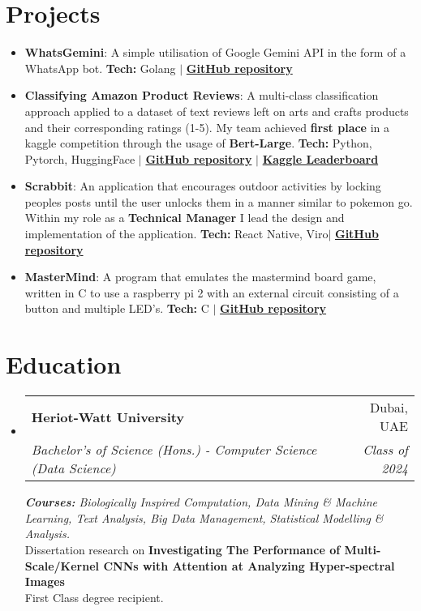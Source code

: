 \documentclass[a4paper,30pt]{article}
\makeatletter
\newcommand{\resumeItem}[2] {
	\item\small{
		\textbf{#1}{: #2 \vspace{-2pt}}
	}
}
\newcommand{\resumeSubheading}[4] {
	\vspace{-1pt}\item
	\begin{tabular*}{0.97\textwidth}{l@{\extracolsep{\fill}}r}
		\textbf{#1} & #2 \\
		\textit{#3} & \textit{#4} \\
	\end{tabular*}\vspace{-5pt}
}
\newcommand{\resumeSubItem}[2]{\resumeItem{#1}{#2}\vspace{-3pt}}
\newcommand{\resumeSubHeadingListStart}{\begin{itemize}[leftmargin=*]}
\newcommand{\resumeSubHeadingListEnd}{\end{itemize}}
\makeatother
\begin{document}
\section{Projects}
	\resumeSubHeadingListStart
        \resumeSubItem{WhatsGemini}{A simple utilisation of Google Gemini API in the form of a WhatsApp bot. \textbf{Tech:} Golang $\vert$ \href{https://github.com/asa30/WhatsGemini}{\textbf{GitHub repository}}}
        \resumeSubItem{Classifying Amazon Product Reviews}{A multi-class classification approach applied to a dataset of text reviews left on arts and crafts products and their corresponding ratings (1-5). My team achieved \textbf{first place} in a kaggle competition through the usage of \textbf{Bert-Large}.
        \textbf{Tech:} Python, Pytorch, HuggingFace
        $\vert$
        \href{https://github.com/fgs2/kaggle-comp-2024}{\textbf{GitHub repository}}
        $\vert$
        \href{https://www.kaggle.com/competitions/f20f21-aa-2023-2024-cw2/leaderboard}{\textbf{Kaggle Leaderboard}}
        }
		\resumeSubItem{Scrabbit}{ An application that encourages outdoor activities by locking peoples posts until the user unlocks them in a manner similar to pokemon go. Within my role as a \textbf{Technical Manager} I lead the design and implementation of the application.  \textbf{Tech:} React Native, Viro$\vert$ \href{https://github.com/Aucta-Studio/Scrabbit-expo}{\textbf{GitHub repository}}}
		\vspace{2pt}
		\resumeSubItem{MasterMind}{ A program that emulates the mastermind board game, written in C to use a raspberry pi 2 with an external circuit consisting of a button and multiple LED's. \textbf{Tech:} C $\vert$ \href{https://github.com/asa30/MasterMind}{\textbf{GitHub repository}}}
		\vspace{2pt}
	\resumeSubHeadingListEnd
	\vspace{-5pt}

\section{Education}
	\resumeSubHeadingListStart
		\resumeSubheading{Heriot-Watt University}{Dubai, UAE}{Bachelor's of Science (Hons.) - Computer Science (Data Science)}{Class of 2024}
		{\scriptsize \textit{ \footnotesize{\newline{}\textbf{Courses:} Biologically Inspired Computation, Data Mining \& Machine Learning, Text Analysis, Big Data Management, Statistical Modelling \& Analysis.}}}
        \\
        Dissertation research on \textbf{Investigating The Performance of Multi-Scale/Kernel CNNs with Attention at Analyzing Hyper-spectral Images}
        \\
        First Class degree recipient.
	\resumeSubHeadingListEnd
\end{document}
